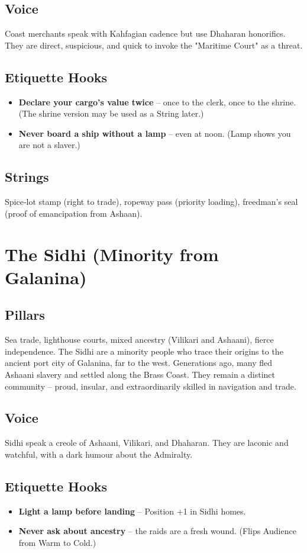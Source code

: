 \documentclass[11pt]{book}
\begin{document}
\subsection*{Voice}
Coast merchants speak with Kahfagian cadence but use Dhaharan honorifics. They are direct, suspicious, and quick to invoke the "Maritime Court" as a threat.

\subsection*{Etiquette Hooks}
\begin{itemize}
    \item \textbf{Declare your cargo's value twice} -- once to the clerk, once to the shrine. (The shrine version may be used as a String later.)
    \item \textbf{Never board a ship without a lamp} -- even at noon. (Lamp shows you are not a slaver.)
\end{itemize}

\subsection*{Strings}
Spice‑lot stamp (right to trade), ropeway pass (priority loading), freedman's seal (proof of emancipation from Ashaan).

\section{The Sidhi (Minority from Galanina)}

\subsection*{Pillars}
Sea trade, lighthouse courts, mixed ancestry (Vilikari and Ashaani), fierce independence. The Sidhi are a minority people who trace their origins to the ancient port city of Galanina, far to the west. Generations ago, many fled Ashaani slavery and settled along the Brass Coast. They remain a distinct community -- proud, insular, and extraordinarily skilled in navigation and trade.

\subsection*{Voice}
Sidhi speak a creole of Ashaani, Vilikari, and Dhaharan. They are laconic and watchful, with a dark humour about the Admiralty.

\subsection*{Etiquette Hooks}
\begin{itemize}
    \item \textbf{Light a lamp before landing} -- Position +1 in Sidhi homes.
    \item \textbf{Never ask about ancestry} -- the raids are a fresh wound. (Flips Audience from Warm to Cold.)
\end{itemize}
\end{document}
